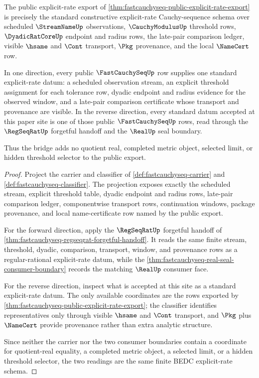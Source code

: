 \begin{theorem}
\label{thm:fastcauchyseq-standard-explicit-rate-bridge}
The public explicit-rate export of
\autoref{thm:fastcauchyseq-public-explicit-rate-export} is precisely the
standard constructive explicit-rate Cauchy-sequence schema over scheduled
$\StreamNameUp$ observations, $\CauchyModulusUp$ threshold rows,
$\DyadicRatCoreUp$ endpoint and radius rows, the late-pair comparison ledger,
visible $\hsame$ and $\Cont$ transport, $\Pkg$ provenance, and the local
$\NameCert$ row.

In one direction, every public $\FastCauchySeqUp$ row supplies one standard
explicit-rate datum: a scheduled observation stream, an explicit threshold
assignment for each tolerance row, dyadic endpoint and radius evidence for the
observed window, and a late-pair comparison certificate whose transport and
provenance are visible. In the reverse direction, every standard datum accepted
at this paper site is one of those public $\FastCauchySeqUp$ rows, read through
the $\RegSeqRatUp$ forgetful handoff and the $\RealUp$ seal boundary.

Thus the bridge adds no quotient real, completed metric object, selected
limit, or hidden threshold selector to the public export.
\end{theorem}
\begin{proof}
Project the carrier and classifier of
\autoref{def:fastcauchyseq-carrier} and
\autoref{def:fastcauchyseq-classifier}. The projection exposes exactly the
scheduled stream, explicit threshold table, dyadic endpoint and radius rows,
late-pair comparison ledger, componentwise transport rows, continuation
windows, package provenance, and local name-certificate row named by the public
export.

For the forward direction, apply the $\RegSeqRatUp$ forgetful handoff of
\autoref{thm:fastcauchyseq-regseqrat-forgetful-handoff}. It reads the same
finite stream, threshold, dyadic, comparison, transport, window, and provenance
rows as a regular-rational explicit-rate datum, while the
\autoref{thm:fastcauchyseq-real-seal-consumer-boundary} records the matching
$\RealUp$ consumer face.

For the reverse direction, inspect what is accepted at this site as a standard
explicit-rate datum. The only available coordinates are the rows exported by
\autoref{thm:fastcauchyseq-public-explicit-rate-export}; the classifier
identifies representatives only through visible $\hsame$ and $\Cont$ transport,
and $\Pkg$ plus $\NameCert$ provide provenance rather than extra analytic
structure.

Since neither the carrier nor the two consumer boundaries contain a coordinate
for quotient-real equality, a completed metric object, a selected limit, or a
hidden threshold selector, the two readings are the same finite BEDC
explicit-rate schema.
\end{proof}

